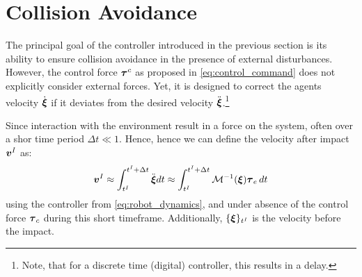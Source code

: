 \section{Collision Avoidance} \label{sec:collision_avoidance}

The principal goal of the controller introduced in the previous section is its ability to ensure collision avoidance in the presence of external disturbances.
However, the control force $\boldsymbol{\tau}^c$ as proposed in \eqref{eq:control_command} does not explicitly consider external forces. Yet, it is designed to correct the agents velocity $\dot{\boldsymbol{\xi}}$ if it deviates from the desired velocity $\ddot{\boldsymbol{\xi}}$.\footnote{Note, that for a discrete time (digital) controller, this results in a delay.}

Since interaction with the environment result in a force on the system, often over a shor time period $\Delta t \ll 1$.  Hence, hence we can define the velocity after impact $\boldsymbol{v}^I$ as:
\begin{align}
	\vect v^I
	  \approx \int_{t^I}^{t^I + \Delta t} \ddot{\vecs \xi} dt  
	  \approx \int_{t^I}^{t^I + \Delta t} \matd{M}^{-1}(\vecs \xi)  \vecs \tau_e \, dt  
	  \label{eq:impact_velocity}
\end{align}
using the controller from \eqref{eq:robot_dynamics}, and under absence of the control force $\boldsymbol{\tau}_c$ during this short timeframe. Additionally, $\{\boldsymbol{\xi} \}_{t^I}$ is the velocity before the impact.
 

